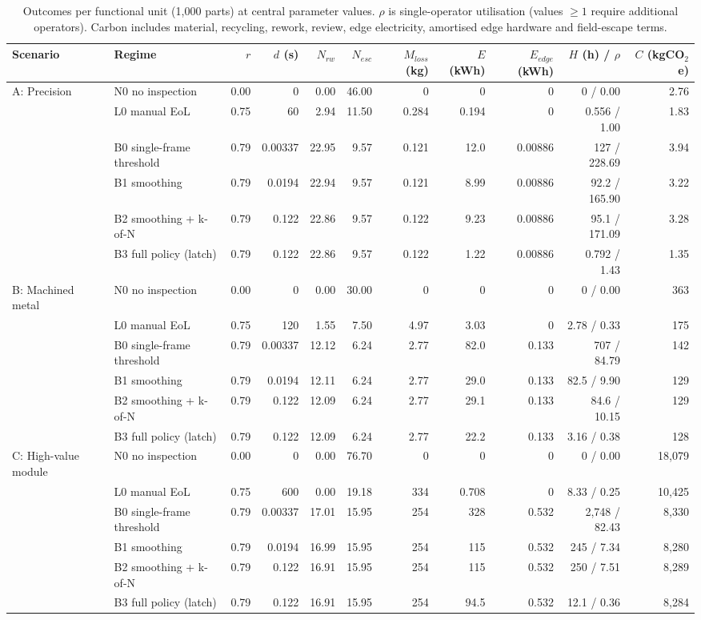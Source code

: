 \begin{table}[!t]
\centering
\scriptsize
\caption{Outcomes per functional unit (1{,}000 parts) at central parameter values. $\rho$ is single-operator utilisation (values $\geq 1$ require additional operators). Carbon includes material, recycling, rework, review, edge electricity, amortised edge hardware and field-escape terms.}
\label{tab:regimes}
\setlength{\tabcolsep}{4pt}
\begin{tabular}{@{}llrrrrrrrrr@{}}
\toprule
Scenario & Regime & $r$ & $d$ (s) & $N_{rw}$ & $N_{esc}$ & $M_{loss}$ (kg) & $E$ (kWh) & $E_{edge}$ (kWh) & $H$ (h) / $\rho$ & $C$ (kgCO$_2$e) \\
\midrule
A: Precision & N0 no inspection & 0.00 & 0 & 0.00 & 46.00 & 0 & 0 & 0 & 0 / 0.00 & 2.76 \\
 & L0 manual EoL & 0.75 & 60 & 2.94 & 11.50 & 0.284 & 0.194 & 0 & 0.556 / 1.00 & 1.83 \\
 & B0 single-frame threshold & 0.79 & 0.00337 & 22.95 & 9.57 & 0.121 & 12.0 & 0.00886 & 127 / 228.69 & 3.94 \\
 & B1 smoothing & 0.79 & 0.0194 & 22.94 & 9.57 & 0.121 & 8.99 & 0.00886 & 92.2 / 165.90 & 3.22 \\
 & B2 smoothing + k-of-N & 0.79 & 0.122 & 22.86 & 9.57 & 0.122 & 9.23 & 0.00886 & 95.1 / 171.09 & 3.28 \\
 & B3 full policy (latch) & 0.79 & 0.122 & 22.86 & 9.57 & 0.122 & 1.22 & 0.00886 & 0.792 / 1.43 & 1.35 \\
\midrule
B: Machined metal & N0 no inspection & 0.00 & 0 & 0.00 & 30.00 & 0 & 0 & 0 & 0 / 0.00 & 363 \\
 & L0 manual EoL & 0.75 & 120 & 1.55 & 7.50 & 4.97 & 3.03 & 0 & 2.78 / 0.33 & 175 \\
 & B0 single-frame threshold & 0.79 & 0.00337 & 12.12 & 6.24 & 2.77 & 82.0 & 0.133 & 707 / 84.79 & 142 \\
 & B1 smoothing & 0.79 & 0.0194 & 12.11 & 6.24 & 2.77 & 29.0 & 0.133 & 82.5 / 9.90 & 129 \\
 & B2 smoothing + k-of-N & 0.79 & 0.122 & 12.09 & 6.24 & 2.77 & 29.1 & 0.133 & 84.6 / 10.15 & 129 \\
 & B3 full policy (latch) & 0.79 & 0.122 & 12.09 & 6.24 & 2.77 & 22.2 & 0.133 & 3.16 / 0.38 & 128 \\
\midrule
C: High-value module & N0 no inspection & 0.00 & 0 & 0.00 & 76.70 & 0 & 0 & 0 & 0 / 0.00 & 18{,}079 \\
 & L0 manual EoL & 0.75 & 600 & 0.00 & 19.18 & 334 & 0.708 & 0 & 8.33 / 0.25 & 10{,}425 \\
 & B0 single-frame threshold & 0.79 & 0.00337 & 17.01 & 15.95 & 254 & 328 & 0.532 & 2{,}748 / 82.43 & 8{,}330 \\
 & B1 smoothing & 0.79 & 0.0194 & 16.99 & 15.95 & 254 & 115 & 0.532 & 245 / 7.34 & 8{,}280 \\
 & B2 smoothing + k-of-N & 0.79 & 0.122 & 16.91 & 15.95 & 254 & 115 & 0.532 & 250 / 7.51 & 8{,}289 \\
 & B3 full policy (latch) & 0.79 & 0.122 & 16.91 & 15.95 & 254 & 94.5 & 0.532 & 12.1 / 0.36 & 8{,}284 \\
\bottomrule
\end{tabular}
\end{table}
